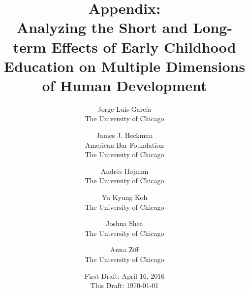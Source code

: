 




\title{\Large \textbf{Appendix: \\ Analyzing the Short and Long-term Effects of Early Childhood Education on Multiple Dimensions of Human Development}}

\author{
Jorge Luis Garc\'{i}a\\
The University of Chicago \and
James J. Heckman \\
American Bar Foundation \\
The University of Chicago \and
Andr\'{e}s Hojman\\
The University of Chicago \and
Yu Kyung Koh \\ 
The University of Chicago \and
Joshua Shea \\
The University of Chicago \and
Anna Ziff \\ 
The University of Chicago}
\date{First Draft: April 16, 2016\\ This Draft: \today}
\maketitle

\singlespacing
\pagebreak
\tableofcontents
\listoffigures
\listoftables
\pagebreak


